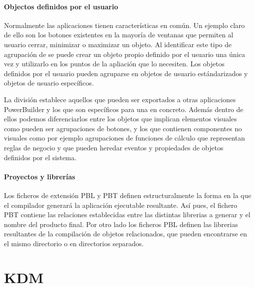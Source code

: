 {\paragraph{Objectos definidos por el usuario}
Normalmente las aplicaciones tienen características en común. Un ejemplo claro de ello son los botones existentes en la mayoría de ventanas que permiten al usuario
cerrar, minimizar o maximizar un objeto.  
Al identificar este tipo de agrupación de  se puede crear un objeto propio definido por el usuario una única vez y utilizarlo en los puntos de la apliación que lo necesiten.
Los objetos definidos por el usuario pueden agruparse en objetos de usuario estándarizados y objetos de usuario específicos. 

La división establece aquellos que pueden ser
exportados a otras aplicaciones PowerBuilder y los que son específicos para una en concreto. Además dentro de ellos podemos diferenciarlos entre los objetos que implican 
elementos visuales como pueden ser agrupaciones de botones, y los que contienen componentes no visuales como por ejemplo agrupaciones de funciones de cálculo que representan 
reglas de negocio y que pueden heredar eventos y propiedades de objetos definidos por el sistema.

\paragraph{Proyectos y librerías}
Los ficheros de extensión PBL y PBT definen estructuralmente la forma en la que el compilador generará la aplicación ejecutable resultante. Así pues, el fichero PBT contiene las relaciones establecidas entre las distintas
librerias a generar y el nombre del producto final. Por otro lado los ficheros PBL definen las librerias resultantes de la compilación de objetos relacionados, que pueden encontrarse en el mismo directorio o
en directorios separados.
\cite{PowerBuilder}

\section{KDM} \label{sec:KDM}

}
